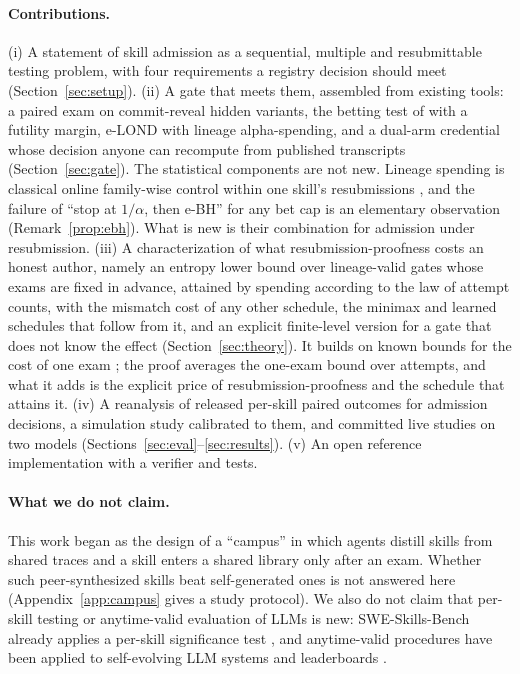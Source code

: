 \paragraph{Contributions.} (i) A statement of skill admission as a sequential, multiple and resubmittable testing problem, with four requirements a registry decision should meet (Section~\ref{sec:setup}). (ii) A gate that meets them, assembled from existing tools: a paired exam on commit-reveal hidden variants, the betting test of \citet{waudbysmith2024betting} with a futility margin, e-LOND \citep{xu2024online} with lineage alpha-spending, and a dual-arm credential whose decision anyone can recompute from published transcripts (Section~\ref{sec:gate}). The statistical components are not new. Lineage spending is classical online family-wise control within one skill's resubmissions \citep{tian2021online}, and the failure of ``stop at $1/\alpha$, then e-BH'' for any bet cap is an elementary observation (Remark~\ref{prop:ebh}). What is new is their combination for admission under resubmission. (iii) A characterization of what resubmission-proofness costs an honest author, namely an entropy lower bound over lineage-valid gates whose exams are fixed in advance, attained by spending according to the law of attempt counts, with the mismatch cost of any other schedule, the minimax and learned schedules that follow from it, and an explicit finite-level version for a gate that does not know the effect (Section~\ref{sec:theory}). It builds on known bounds for the cost of one exam \citep{agrawal2025stopping,larsson2025numeraire}; the proof averages the one-exam bound over attempts, and what it adds is the explicit price of resubmission-proofness and the schedule that attains it. (iv) A reanalysis of released per-skill paired outcomes for admission decisions, a simulation study calibrated to them, and committed live studies on two models (Sections~\ref{sec:eval}--\ref{sec:results}). (v) An open reference implementation with a verifier and tests.

\paragraph{What we do not claim.} This work began as the design of a ``campus'' in which agents distill skills from shared traces and a skill enters a shared library only after an exam. Whether such peer-synthesized skills beat self-generated ones is not answered here (Appendix~\ref{app:campus} gives a study protocol). We also do not claim that per-skill testing or anytime-valid evaluation of LLMs is new: SWE-Skills-Bench already applies a per-skill significance test \citep{han2026sweskillsbench}, and anytime-valid procedures have been applied to self-evolving LLM systems and leaderboards \citep{yin2026enough,gao2026bbedge}.
